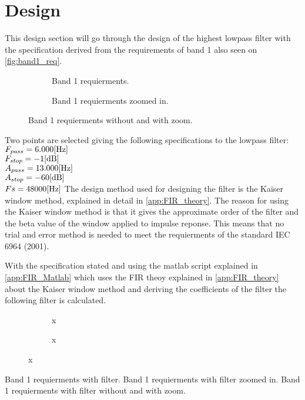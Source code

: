 \section{Design}
This design section will go through the design of the highest lowpass filter with the specification derived from the requirements of band 1 also seen on \autoref{fig:band1_req}.
\begin{figure}[H]
\centering
\begin{subfigure}[t]{0.47\textwidth}
	\scalebox{0.5}{
	}
	\caption{Band 1 requierments.}
	\label{fig:band1_req}
\end{subfigure}
\hspace{6mm} 
\begin{subfigure}[t]{0.35\textwidth}
	\scalebox{0.5}{
	}
	\caption{Band 1 requierments zoomed in.}
	\label{fig:band1_reqZoom}
\end{subfigure}
\caption{Band 1 requierments without and with zoom.}
\label{fig:band1_reqOverview}
\end{figure}
Two points are selected giving the following specifications to the lowpass filter:
$F_{pass}=6.000 \enhed{Hz}$\\
$F_{stop}=-1 \enhed{dB}$\\
$A_{pass}=13.000 \enhed{Hz}$\\
$A_{stop}=-60 \enhed{dB}$\\
$Fs=48000 \enhed{Hz}$
The design method used for designing the filter is the Kaiser window method, explained in detail in \autoref{app:FIR_theory}. The reason for using the Kaiser window method is that it gives the approximate order of the filter and the beta value of the window applied to impulse reponse. This means that no trial and error method is needed to meet the requierments of the standard IEC 6964 (2001).

With the specification stated and using the matlab script explained in \autoref{app:FIR_Matlab} which uses the FIR theoy explained in \autoref{app:FIR_theory} about the Kaiser window method and deriving the coefficients of the filter the following filter is calculated. 
\begin{figure}[H]
\centering
\begin{subfigure}[t]{0.47\textwidth}
	\scalebox{0.5}{
	}
	\caption{x}
	\label{fig:band1_filt}
\end{subfigure}
\hspace{6mm} 
\begin{subfigure}[t]{0.35\textwidth}
	\scalebox{0.5}{
	}
	\caption{x}
	\label{fig:band1_filtZoom}
\end{subfigure}
\caption{x}
\label{fig:band1_FiltOverview}
\end{figure}


Band 1 requierments with filter.
Band 1 requierments with filter zoomed in.
Band 1 requierments with filter without and with zoom.


  